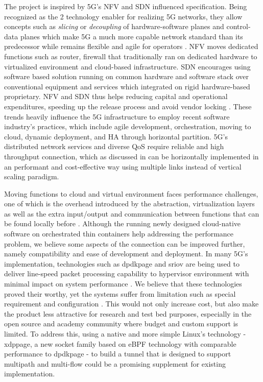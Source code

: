 The project is inspired by \ac{5G}'s \ac{NFV} and \ac{SDN} influenced specification.
Being recognized as the 2 technology enabler for realizing 5G networks, they allow concepts such as \textit{slicing} or \textit{decoupling} of hardware-software planes and control-data planes \cite{yousaf_nfv_sdn_key_techno_for_5g2017} \cite{open_baton} which make \ac{5G} a much more capable network standard than its predecessor while remains flexible and agile for operators .
\ac{NFV} moves dedicated functions such as router, firewall that traditionally ran on dedicated hardware to virtualized environment and cloud-based infrastructure.
\ac{SDN} encourages using software based solution running on common hardware and software stack over conventional equipment and services which integrated on rigid hardware-based proprietary.
\ac{NFV} and \ac{SDN} thus helps reducing capital and operational expenditures, speeding up the release process and avoid vendor locking \cite{yousaf_nfv_sdn_key_techno_for_5g2017} \cite{sun_integrating_2015}.
These trends heavily influence the 5G infrastructure to employ recent software industry's practices, which include agile development, orchestration, moving to cloud, dynamic deployment, and \ac{HA} through horizontal partition.
\ac{5G}'s distributed network services and diverse \ac{QoS} require reliable and high throughput connection, which as discussed in  can be horizontally implemented in an performant and cost-effective way using multiple links instead of vertical scaling paradigm.

Moving functions to cloud and virtual environment faces performance challenges, one of which is the overhead introduced by the abstraction, virtualization layers as well as the extra input/output and communication between functions that can be found locally before \cite{yousaf_nfv_sdn_key_techno_for_5g2017}.
Although the running newly designed cloud-native software on orchestrated thin containers help addressing the performance problem, we believe some aspects of the connection can be improved further, namely compatibility and ease of development and deployment.
In many 5G's implementation, technologies such as \ac{dpdkpage} and \ac{sriov} are being used to deliver line-speed packet processing capability to hypervisor environment with minimal impact on system performance \cite{intel_dpdk_perf} \cite{openstack_sriov} \cite{zte_5g_core_upf_impl} \cite{nec_hite_paper_upf_perf}.
We believe that these technologies proved their worthy, yet the systems suffer from limitation such as special requirement and configuration .
This would not only increase cost, but also make the product less attractive for research and test bed purposes, especially in the open source and academy community where budget and custom support is limited.
To address this, using a native and more simple Linux's technology - \ac{xdppage}, a new socket family based on eBPF technology with comparable performance to \ac{dpdkpage} - to build a tunnel that is designed to support multipath and multi-flow could be a promising supplement for existing implementation. 



